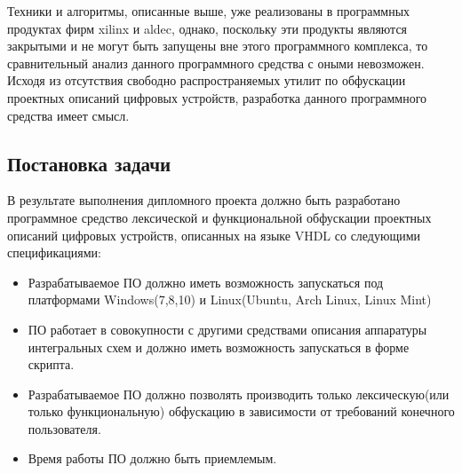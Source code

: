Техники и алгоритмы, описанные выше, уже реализованы в программных продуктах фирм xilinx и aldec, однако, поскольку эти продукты являются закрытыми и не могут быть запущены вне этого программного комплекса, то сравнительный анализ данного программного средства с оными невозможен. Исходя из отсутствия свободно распространяемых утилит по обфускации проектных описаний цифровых устройств, разработка данного программного средства имеет смысл.


\subsection{Постановка задачи}
В результате выполнения дипломного проекта должно быть разработано программное средство лексической и функциональной обфускации проектных описаний цифровых устройств, описанных на языке VHDL со следующими спецификациями:
\begin{itemize}
\item Разрабатываемое ПО должно иметь возможность запускаться под платформами Windows(7,8,10) и Linux(Ubuntu, Arch Linux, Linux Mint)
\item ПО работает в совокупности с другими средствами описания аппаратуры интегральных схем и должно иметь возможность запускаться в форме скрипта.
\item Разрабатываемое ПО должно позволять производить только лексическую(или только функциональную) обфускацию в зависимости от требований конечного пользователя.
\item Время работы ПО должно быть приемлемым.
\end{itemize}


